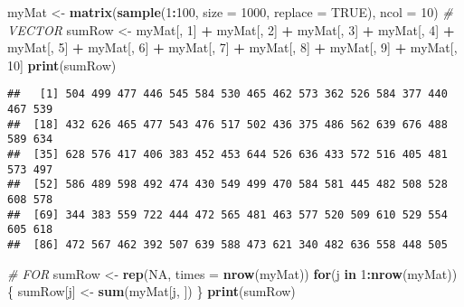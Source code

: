\documentclass[]{book}
\newenvironment{Shaded}{\begin{snugshade}}{\end{snugshade}}
\newcommand{\KeywordTok}[1]{\textcolor[rgb]{0.13,0.29,0.53}{\textbf{#1}}}
\newcommand{\DataTypeTok}[1]{\textcolor[rgb]{0.13,0.29,0.53}{#1}}
\newcommand{\DecValTok}[1]{\textcolor[rgb]{0.00,0.00,0.81}{#1}}
\newcommand{\StringTok}[1]{\textcolor[rgb]{0.31,0.60,0.02}{#1}}
\newcommand{\CommentTok}[1]{\textcolor[rgb]{0.56,0.35,0.01}{\textit{#1}}}
\newcommand{\OtherTok}[1]{\textcolor[rgb]{0.56,0.35,0.01}{#1}}
\newcommand{\ControlFlowTok}[1]{\textcolor[rgb]{0.13,0.29,0.53}{\textbf{#1}}}
\newcommand{\OperatorTok}[1]{\textcolor[rgb]{0.81,0.36,0.00}{\textbf{#1}}}
\newcommand{\NormalTok}[1]{#1}
\theoremstyle{definition}
\theoremstyle{definition}
\theoremstyle{definition}
\theoremstyle{remark}
\begin{document}
\begin{Shaded}
\begin{Highlighting}[]
\NormalTok{myMat <-}\StringTok{ }\KeywordTok{matrix}\NormalTok{(}\KeywordTok{sample}\NormalTok{(}\DecValTok{1}\OperatorTok{:}\DecValTok{100}\NormalTok{, }\DataTypeTok{size =} \DecValTok{1000}\NormalTok{, }\DataTypeTok{replace =} \OtherTok{TRUE}\NormalTok{), }\DataTypeTok{ncol =} \DecValTok{10}\NormalTok{)}
\CommentTok{# VECTOR}
\NormalTok{sumRow <-}\StringTok{ }\NormalTok{myMat[, }\DecValTok{1}\NormalTok{] }\OperatorTok{+}\StringTok{ }\NormalTok{myMat[, }\DecValTok{2}\NormalTok{] }\OperatorTok{+}\StringTok{ }\NormalTok{myMat[, }\DecValTok{3}\NormalTok{] }\OperatorTok{+}\StringTok{ }\NormalTok{myMat[, }\DecValTok{4}\NormalTok{] }\OperatorTok{+}\StringTok{ }
\StringTok{  }\NormalTok{myMat[, }\DecValTok{5}\NormalTok{] }\OperatorTok{+}\StringTok{ }\NormalTok{myMat[, }\DecValTok{6}\NormalTok{] }\OperatorTok{+}\StringTok{ }\NormalTok{myMat[, }\DecValTok{7}\NormalTok{] }\OperatorTok{+}\StringTok{ }\NormalTok{myMat[, }\DecValTok{8}\NormalTok{] }\OperatorTok{+}\StringTok{ }
\StringTok{  }\NormalTok{myMat[, }\DecValTok{9}\NormalTok{] }\OperatorTok{+}\StringTok{ }\NormalTok{myMat[, }\DecValTok{10}\NormalTok{]}
\KeywordTok{print}\NormalTok{(sumRow)}
\end{Highlighting}
\end{Shaded}

\begin{verbatim}
##   [1] 504 499 477 446 545 584 530 465 462 573 362 526 584 377 440 467 539
##  [18] 432 626 465 477 543 476 517 502 436 375 486 562 639 676 488 589 634
##  [35] 628 576 417 406 383 452 453 644 526 636 433 572 516 405 481 573 497
##  [52] 586 489 598 492 474 430 549 499 470 584 581 445 482 508 528 608 578
##  [69] 344 383 559 722 444 472 565 481 463 577 520 509 610 529 554 605 618
##  [86] 472 567 462 392 507 639 588 473 621 340 482 636 558 448 505
\end{verbatim}

\begin{Shaded}
\begin{Highlighting}[]
\CommentTok{# FOR}
\NormalTok{sumRow <-}\StringTok{ }\KeywordTok{rep}\NormalTok{(}\OtherTok{NA}\NormalTok{, }\DataTypeTok{times =} \KeywordTok{nrow}\NormalTok{(myMat))}
\ControlFlowTok{for}\NormalTok{(j }\ControlFlowTok{in} \DecValTok{1}\OperatorTok{:}\KeywordTok{nrow}\NormalTok{(myMat))\{}
\NormalTok{  sumRow[j] <-}\StringTok{ }\KeywordTok{sum}\NormalTok{(myMat[j, ])}
\NormalTok{\}}
\KeywordTok{print}\NormalTok{(sumRow)}
\end{Highlighting}
\end{Shaded}
\end{document}
